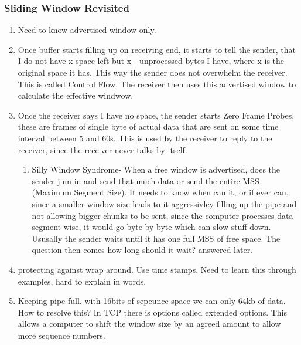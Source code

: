 \documentclass[11pt, a4paper]{article}
\begin{document}
\subsubsection{Sliding Window Revisited}
\begin{enumerate}
    \item Need to know advertised window only.
    \item Once buffer starts filling up on receiving end, it starts to tell the sender, that I do not have x space left but x - unprocessed bytes I have, where x is the original space it has. This way the sender does not overwhelm the receiver. This is called Control Flow. The receiver then uses this advertised window to calculate the effective windwow.
    \item Once the receiver says I have no space, the sender starts Zero Frame Probes, these are frames of single byte of actual data that are sent on some time interval between 5 and 60s. This is used by the receiver to reply to the receiver, since the receiver never talks by itself.
    \begin{enumerate}
        \item Silly Window Syndrome- When a free window is advertised, does the sender jum in and send that much data or send the entire MSS (Maximum Segment Size). It needs to know when can it, or if ever can, since a smaller window size leads to it aggressivley filling up the pipe and not allowing bigger chunks to be sent, since the computer processes data segment wise, it would go byte by byte which can slow stuff down. Ususally the sender waits until it has one full MSS of free space. The question then comes how long should it wait? answered later.
    \end{enumerate}
    \item protecting against wrap around. Use time stamps. Need to learn this through examples, hard to explain in words.
    \item Keeping pipe full. with 16bits of sepeunce space we can only 64kb of data. How to resolve this? In TCP there is options called extended options. This allows a computer to shift the window size by an agreed amount to allow more sequence numbers.
\end{enumerate}
\end{document}
